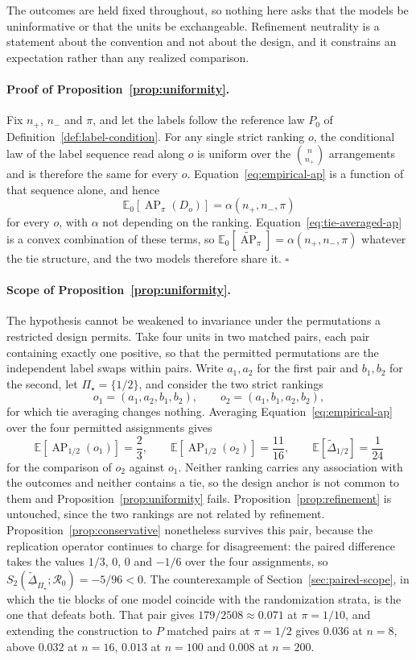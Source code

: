 \documentclass[11pt]{article}
\newcommand{\AP}{\operatorname{AP}}
\newcommand{\Regime}{\mathcal{R}}
\newcommand{\PSet}{\Pi_\star}
\newcommand{\E}{\mathbb{E}}
\newcommand{\APta}{\widetilde{\AP}}
\newcommand{\Dta}{\widetilde{\Delta}}
\newcommand{\RobDta}{\underline{\widetilde{\Delta}}_{\PSet}}
\theoremstyle{remark}
\begin{document}
The outcomes are held fixed throughout, so nothing here asks that the models be uninformative or that the units be exchangeable. Refinement neutrality is a statement about the convention and not about the design, and it constrains an expectation rather than any realized comparison.

\paragraph{Proof of Proposition~\ref{prop:uniformity}.}
Fix $n_+$, $n_-$ and $\pi$, and let the labels follow the reference law $P_0$ of Definition~\ref{def:label-condition}. For any single strict ranking $o$, the conditional law of the label sequence read along $o$ is uniform over the $\binom{n}{n_+}$ arrangements and is therefore the same for every $o$. Equation~\eqref{eq:empirical-ap} is a function of that sequence alone, and hence
\[
\E_0\left[\AP_\pi(D_o)\right]
=
\alpha(n_+,n_-,\pi)
\]
for every $o$, with $\alpha$ not depending on the ranking. Equation~\eqref{eq:tie-averaged-ap} is a convex combination of these terms, so $\E_0[\APta_\pi]=\alpha(n_+,n_-,\pi)$ whatever the tie structure, and the two models therefore share it. $\square$

\paragraph{Scope of Proposition~\ref{prop:uniformity}.}
The hypothesis cannot be weakened to invariance under the permutations a restricted design permits. Take four units in two matched pairs, each pair containing exactly one positive, so that the permitted permutations are the independent label swaps within pairs. Write $a_1,a_2$ for the first pair and $b_1,b_2$ for the second, let $\PSet=\{1/2\}$, and consider the two strict rankings
\[
o_1=(a_1,a_2,b_1,b_2),
\qquad
o_2=(a_1,b_1,a_2,b_2),
\]
for which tie averaging changes nothing. Averaging Equation~\eqref{eq:empirical-ap} over the four permitted assignments gives
\[
\E\left[\AP_{1/2}(o_1)\right]=\frac23,
\qquad
\E\left[\AP_{1/2}(o_2)\right]=\frac{11}{16},
\qquad
\E\left[\Dta_{1/2}\right]=\frac{1}{24}
\]
for the comparison of $o_2$ against $o_1$. Neither ranking carries any association with the outcomes and neither contains a tie, so the design anchor is not common to them and Proposition~\ref{prop:uniformity} fails. Proposition~\ref{prop:refinement} is untouched, since the two rankings are not related by refinement. Proposition~\ref{prop:conservative} nonetheless survives this pair, because the replication operator continues to charge for disagreement: the paired difference takes the values $1/3$, $0$, $0$ and $-1/6$ over the four assignments, so $S_2(\RobDta;\Regime_0)=-5/96<0$. The counterexample of Section~\ref{sec:paired-scope}, in which the tie blocks of one model coincide with the randomization strata, is the one that defeats both. That pair gives $179/2508\approx0.071$ at $\pi=1/10$, and extending the construction to $P$ matched pairs at $\pi=1/2$ gives $0.036$ at $n=8$, above $0.032$ at $n=16$, $0.013$ at $n=100$ and $0.008$ at $n=200$.
\end{document}
